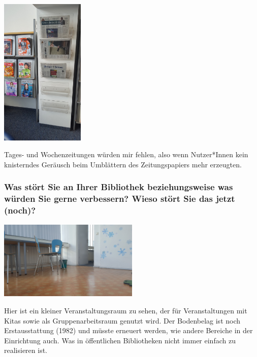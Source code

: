 \begin{center}
\includegraphics[width=0.3\textwidth]{kisch/img/zeitungen.jpg}
\end{center}

Tages- und Wochenzeitungen würden mir fehlen, also wenn Nutzer*Innen
kein knisterndes Geräusch beim Umblättern des Zeitungspapiers mehr
erzeugten.

\hypertarget{was-stuxf6rt-sie-an-ihrer-bibliothek-beziehungsweise-was-wuxfcrden-sie-gerne-verbessern-wieso-stuxf6rt-sie-das-jetzt-noch}{%
\subsubsection*{Was stört Sie an Ihrer Bibliothek beziehungsweise was würden
Sie gerne verbessern? Wieso stört Sie das jetzt
(noch)?}\label{was-stuxf6rt-sie-an-ihrer-bibliothek-beziehungsweise-was-wuxfcrden-sie-gerne-verbessern-wieso-stuxf6rt-sie-das-jetzt-noch}}

\begin{center}
\includegraphics[width=0.5\textwidth]{kisch/img/veranstaltungsraum.jpg}
\end{center}

Hier ist ein kleiner Veranstaltungsraum zu sehen, der für
Veranstaltungen mit Kitas sowie als Gruppenarbeitsraum genutzt wird. Der
Bodenbelag ist noch Erstausstattung (1982) und müsste erneuert werden,
wie andere Bereiche in der Einrichtung auch. Was in öffentlichen
Bibliotheken nicht immer einfach zu realisieren ist.

